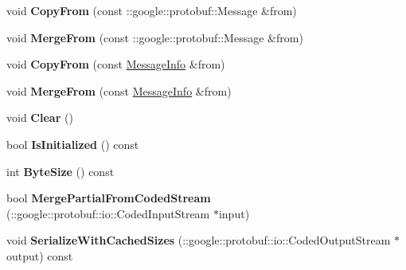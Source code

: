 \begin{DoxyCompactItemize}
\item 
\hypertarget{classstruct_definitions_1_1_message_info_a4394928bfeb8da685156d28f7d46ab1b}{}\label{classstruct_definitions_1_1_message_info_a4394928bfeb8da685156d28f7d46ab1b} 
void {\bfseries Copy\+From} (const \+::google\+::protobuf\+::\+Message \&from)
\item 
\hypertarget{classstruct_definitions_1_1_message_info_ae89487971a3b747d3bd2e4a9376311a3}{}\label{classstruct_definitions_1_1_message_info_ae89487971a3b747d3bd2e4a9376311a3} 
void {\bfseries Merge\+From} (const \+::google\+::protobuf\+::\+Message \&from)
\item 
\hypertarget{classstruct_definitions_1_1_message_info_ade6c87ec1d4f192d0a49a55062d8042a}{}\label{classstruct_definitions_1_1_message_info_ade6c87ec1d4f192d0a49a55062d8042a} 
void {\bfseries Copy\+From} (const \hyperlink{classstruct_definitions_1_1_message_info}{Message\+Info} \&from)
\item 
\hypertarget{classstruct_definitions_1_1_message_info_a7e37817c1437d09e3acf54fe8a5a8835}{}\label{classstruct_definitions_1_1_message_info_a7e37817c1437d09e3acf54fe8a5a8835} 
void {\bfseries Merge\+From} (const \hyperlink{classstruct_definitions_1_1_message_info}{Message\+Info} \&from)
\item 
\hypertarget{classstruct_definitions_1_1_message_info_afcbcad585e261c139675054e3e5253b9}{}\label{classstruct_definitions_1_1_message_info_afcbcad585e261c139675054e3e5253b9} 
void {\bfseries Clear} ()
\item 
\hypertarget{classstruct_definitions_1_1_message_info_ab6d5add55fcb6e0cf56ab8755a71ea61}{}\label{classstruct_definitions_1_1_message_info_ab6d5add55fcb6e0cf56ab8755a71ea61} 
bool {\bfseries Is\+Initialized} () const
\item 
\hypertarget{classstruct_definitions_1_1_message_info_ac4e9b7019cc5b4bf1cd57d809ca775bd}{}\label{classstruct_definitions_1_1_message_info_ac4e9b7019cc5b4bf1cd57d809ca775bd} 
int {\bfseries Byte\+Size} () const
\item 
\hypertarget{classstruct_definitions_1_1_message_info_a793b2b8b117b21cb20a5deee55796960}{}\label{classstruct_definitions_1_1_message_info_a793b2b8b117b21cb20a5deee55796960} 
bool {\bfseries Merge\+Partial\+From\+Coded\+Stream} (\+::google\+::protobuf\+::io\+::\+Coded\+Input\+Stream $\ast$input)
\item 
\hypertarget{classstruct_definitions_1_1_message_info_a9c00f6dd5aafcd43820264a596704434}{}\label{classstruct_definitions_1_1_message_info_a9c00f6dd5aafcd43820264a596704434} 
void {\bfseries Serialize\+With\+Cached\+Sizes} (\+::google\+::protobuf\+::io\+::\+Coded\+Output\+Stream $\ast$output) const

\end{DoxyCompactItemize}
